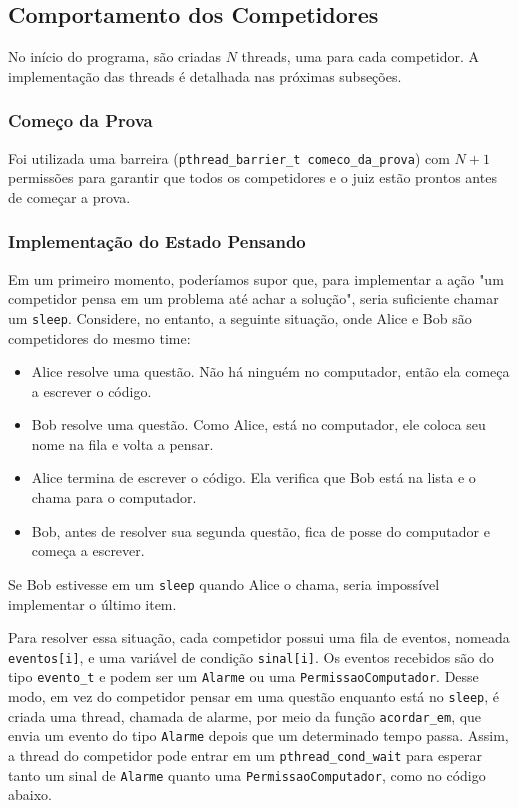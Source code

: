 \documentclass[11pt]{article}
\newcommand{\code}{\lstinline[mathescape=true]}
\begin{document}
\subsection{Comportamento dos Competidores}
No início do programa, são criadas $N$ threads, uma para cada competidor. A implementação das threads é
detalhada nas próximas subseções.

\subsubsection{Começo da Prova}
Foi utilizada uma barreira (\code{pthread_barrier_t comeco_da_prova}) com $N + 1$ permissões para garantir que todos os competidores e o juiz
estão prontos antes de começar a prova.

\subsubsection{Implementação do Estado Pensando}
Em um primeiro momento, poderíamos supor que, para implementar a ação "um competidor pensa em um
problema até achar a solução", seria suficiente chamar um \code{sleep}. Considere, no entanto, a
seguinte situação, onde Alice e Bob são competidores do mesmo time:

\begin{itemize}
	\item Alice resolve uma questão. Não há ninguém no computador, então ela começa a escrever o
		código.
	\item Bob resolve uma questão. Como Alice, está no computador, ele coloca seu nome na fila e
		volta a pensar.
	\item Alice termina de escrever o código. Ela verifica que Bob está na lista e o chama para o
		computador.
	\item Bob, antes de resolver sua segunda questão, fica de posse do computador e começa a
		escrever.
\end{itemize}

Se Bob estivesse em um \code{sleep} quando Alice o chama, seria impossível implementar o último item.

Para resolver essa situação, cada competidor possui uma fila de eventos, nomeada \code{eventos[i]}, e
uma variável de condição \code{sinal[i]}. Os eventos recebidos são do tipo \code{evento_t} e podem
ser um \code{Alarme} ou uma \code{PermissaoComputador}. Desse modo, em vez do competidor pensar em
uma questão enquanto está no \code{sleep}, é criada uma thread, chamada de alarme, por meio da função
\code{acordar_em}, que envia um evento do tipo \code{Alarme} depois que um determinado tempo passa.
Assim, a thread do competidor pode entrar em um \code{pthread_cond_wait} para esperar tanto um sinal
de \code{Alarme} quanto uma \code{PermissaoComputador}, como no código abaixo.
\end{document}
